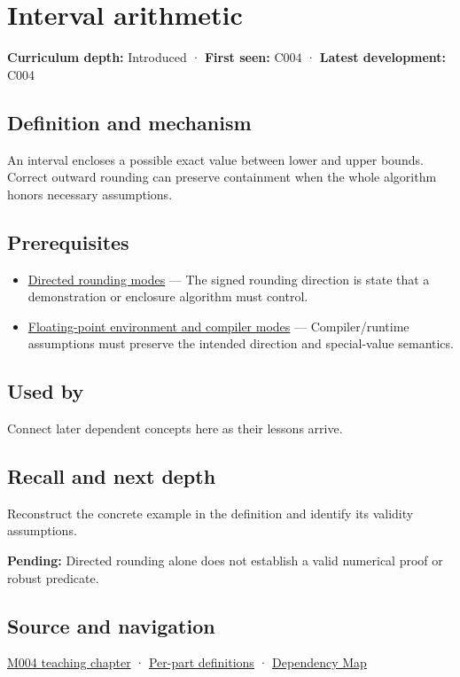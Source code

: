\hypertarget{appendix-1823a14330cb}{}\label{referencestart:appendix-1823a14330cb}
\section{Interval arithmetic}\label{appendix-1823a14330cb-interval-arithmetic}

\textbf{Curriculum depth:} Introduced · \textbf{First seen:} C004 · \textbf{Latest development:} C004

\subsection{Definition and mechanism}\label{appendix-1823a14330cb-definition-and-mechanism}

An interval encloses a possible exact value between lower and upper bounds. Correct outward rounding can preserve containment when the whole algorithm honors necessary assumptions.

\subsection{Prerequisites}\label{appendix-1823a14330cb-prerequisites}

\begin{itemize}
\tightlist
\item
  \hyperref[appendix-637d164ae5ca]{Directed rounding modes} --- The signed rounding direction is state that a demonstration or enclosure algorithm must control.
\item
  \hyperref[appendix-f11d1a521253]{Floating-point environment and compiler modes} --- Compiler/runtime assumptions must preserve the intended direction and special-value semantics.
\end{itemize}

\subsection{Used by}\label{appendix-1823a14330cb-used-by}

Connect later dependent concepts here as their lessons arrive.

\subsection{Recall and next depth}\label{appendix-1823a14330cb-recall-and-next-depth}

Reconstruct the concrete example in the definition and identify its validity assumptions.

\textbf{Pending:} Directed rounding alone does not establish a valid numerical proof or robust predicate.

\subsection{Source and navigation}\label{appendix-1823a14330cb-source-and-navigation}

\hyperref[01-foundations-i-ch001-a-stretching-ruler-for-real-valued-quantities]{M004 teaching chapter} · \hyperref[appendix-fd090d982a15-m004---parts-61-76]{Per-part definitions} · \hyperref[appendix-4ad47bdd269a]{Dependency Map}
